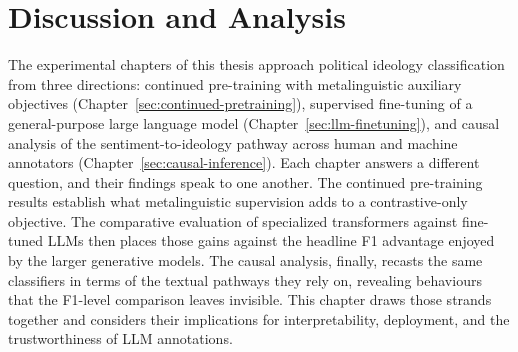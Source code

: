 \chapter{Discussion and Analysis}
\label{sec:discussion}

The experimental chapters of this thesis approach political ideology classification from three directions: continued pre-training with metalinguistic auxiliary objectives (Chapter~\ref{sec:continued-pretraining}), supervised fine-tuning of a general-purpose large language model (Chapter~\ref{sec:llm-finetuning}), and causal analysis of the sentiment-to-ideology pathway across human and machine annotators (Chapter~\ref{sec:causal-inference}). Each chapter answers a different question, and their findings speak to one another. The continued pre-training results establish what metalinguistic supervision adds to a contrastive-only objective. The comparative evaluation of specialized transformers against fine-tuned LLMs then places those gains against the headline F1 advantage enjoyed by the larger generative models. The causal analysis, finally, recasts the same classifiers in terms of the textual pathways they rely on, revealing behaviours that the F1-level comparison leaves invisible. This chapter draws those strands together and considers their implications for interpretability, deployment, and the trustworthiness of LLM annotations.




